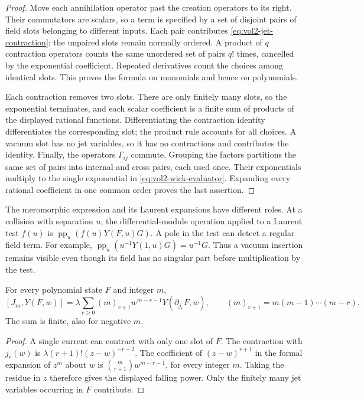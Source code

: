 \begin{proof}
Move each annihilation operator past the creation operators to its
right. Their commutators are scalars, so a term is specified by a set
of disjoint pairs of field slots belonging to different inputs. Each
pair contributes \eqref{eq:vol2-jet-contraction}; the unpaired slots
remain normally ordered. A product of $q$ contraction operators counts
the same unordered set of pairs $q!$ times, cancelled by the
exponential coefficient. Repeated derivatives count the choices among
identical slots. This proves the formula on monomials and hence on
polynomials.

Each contraction removes two slots. There are only finitely many
slots, so the exponential terminates, and each scalar coefficient is
a finite sum of products of the displayed rational functions.
Differentiating the contraction identity differentiates the corresponding
slot; the product rule accounts for all choices. A vacuum slot has no
jet variables, so it has no contractions and contributes the identity.
Finally, the operators $\Gamma_{ij}$ commute. Grouping the factors
partitions the same set of pairs into internal and cross pairs, each
used once. Their exponentials multiply to the single exponential in
\eqref{eq:vol2-wick-evaluator}. Expanding every rational coefficient in
one common order proves the last assertion.
\end{proof}

The meromorphic expression and its Laurent expansions have different
roles. At a collision with separation $u$, the differential-module
operation applied to a Laurent test $f(u)$ is
$\operatorname{pp}_u(f(u)Y(F,u)G)$.
A pole in the test can detect a regular field term. For example,
$\operatorname{pp}_u(u^{-1}Y(1,u)G)=u^{-1}G$.
Thus a vacuum insertion remains visible even though its field has no
singular part before multiplication by the test.

\begin{proposition}
\label{prop:vol2-polynomial-current-modes}
For every polynomial state $F$ and integer $m$,
\begin{equation}\label{eq:vol2-polynomial-current-modes}
 [J_m,Y(F,w)]
 =\lambda\sum_{r\geq0}(m)_{r+1}w^{m-r-1}
                 Y(\partial_{j_r}F,w),
 \qquad (m)_{r+1}=m(m-1)\cdots(m-r).
\end{equation}
The sum is finite, also for negative $m$.
\end{proposition}

\begin{proof}
A single current can contract with only one slot of $F$.
The contraction with $j_r(w)$ is
$\lambda(r+1)!(z-w)^{-r-2}$.
The coefficient of $(z-w)^{r+1}$ in the formal expansion of
$z^m$ about $w$ is $\binom m{r+1}w^{m-r-1}$, for every integer
$m$. Taking the residue in $z$ therefore gives the displayed falling
power. Only the finitely many jet variables occurring in $F$ contribute.
\end{proof}

